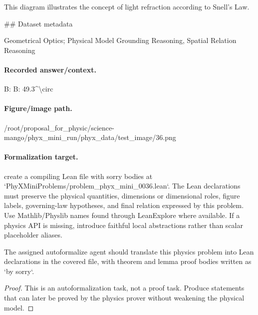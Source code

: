 This diagram illustrates the concept of light refraction according to Snell's Law.

\#\# Dataset metadata

Geometrical Optics; Physical Model Grounding Reasoning, Spatial Relation Reasoning

\paragraph{Recorded answer/context.}
B: B: 49.3\textasciicircum{}\textbackslash{}circ

\paragraph{Figure/image path.}
/root/proposal\_for\_physic/science-mango/phyx\_mini\_run/phyx\_data/test\_image/36.png

\paragraph{Formalization target.}
create a compiling Lean file with sorry bodies at `PhyXMiniProblems/problem\_phyx\_mini\_0036.lean`. The Lean declarations must preserve the physical quantities, dimensions or dimensional roles, figure labels, governing-law hypotheses, and final relation expressed by this problem.
Use Mathlib/Physlib names found through LeanExplore where available. If a physics API is missing, introduce faithful local abstractions rather than scalar placeholder aliases.

\begin{theorem}
\label{thm:physics:phyx_mini_0036:target}
The assigned autoformalize agent should translate this physics problem into Lean declarations in the covered file, with theorem and lemma proof bodies written as `by sorry`.
\end{theorem}
\begin{proof}
This is an autoformalization task, not a proof task. Produce statements that can later be proved by the physics prover without weakening the physical model.
\end{proof}

